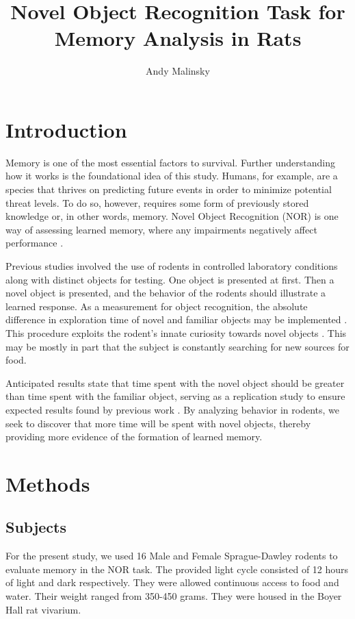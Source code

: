 \documentclass[a4paper, 12pt]{article}
\title{Novel Object Recognition Task for Memory Analysis in Rats}
\author{Andy Malinsky}
\begin{document}
\maketitle

\section{Introduction}
Memory is one of the most essential factors to survival. Further understanding how it works is the foundational idea of this study. Humans, for example, are a species that thrives on predicting future events in order to minimize potential threat levels. To do so, however, requires some form of previously stored knowledge or, in other words, memory. Novel Object Recognition (NOR) is one way of assessing learned memory, where any impairments negatively affect performance \cite{broadbent2004spatial}. 

Previous studies involved the use of rodents in controlled laboratory conditions along with distinct objects for testing. One object is presented at first. Then a novel object is presented, and the behavior of the rodents should illustrate a learned response. As a measurement for object recognition, the absolute difference in exploration time of novel and familiar objects may be implemented \cite{leger2013object, antunes2012novel}. This procedure exploits the rodent's innate curiosity towards novel objects \cite{bevins2006object}. This may be mostly in part that the subject is constantly searching for new sources for food.

Anticipated results state that time spent with the novel object should be greater than time spent with the familiar object, serving as a replication study to ensure expected results found by previous work \cite{leger2013object, reger2009ontogeny, sutcliffe2007influence}. By analyzing behavior in rodents, we seek to discover that more time will be spent with novel objects, thereby providing more evidence of the formation of learned memory.

\section{Methods}
\subsection{Subjects}
For the present study, we used 16 Male and Female Sprague-Dawley rodents to evaluate memory in the NOR task. The provided light cycle consisted of 12 hours of light and dark respectively. They were allowed continuous access to food and water. Their weight ranged from 350-450 grams. They were housed in the Boyer Hall rat vivarium.
\end{document}
